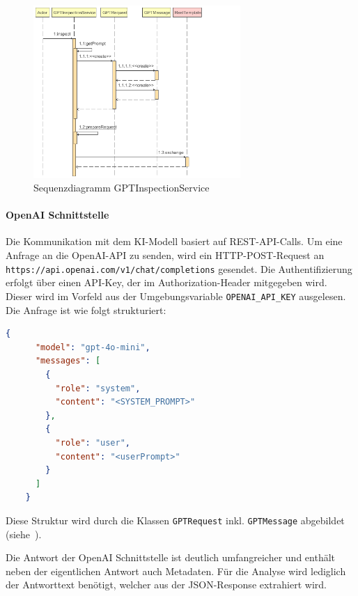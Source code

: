 \documentclass[a4paper,12pt]{report}
\begin{document}
    \begin{figure}[h]
        \centering
        \includegraphics[width=0.7\textwidth]{assets/GPTInspectionService_inspect_seq_diag}
        \caption{Sequenzdiagramm GPTInspectionService}
        \label{fig:seq-diag-gpt-inspection-service}
    \end{figure}

    \clearpage
    \paragraph*{OpenAI Schnittstelle}\label{par:openai-schnittstelle}
    Die Kommunikation mit dem KI-Modell basiert auf REST-API-Calls.
    Um eine Anfrage an die OpenAI-API zu senden, wird ein HTTP-POST-Request an \texttt{https://api.openai.com/v1/chat/completions} gesendet.
    Die Authentifizierung erfolgt über einen API-Key, der im Authorization-Header mitgegeben wird.
    Dieser wird im Vorfeld aus der Umgebungsvariable \texttt{OPENAI\_API\_KEY} ausgelesen.
    Die Anfrage ist wie folgt strukturiert:

    \begin{lstlisting}[language=json,label={lst:openai-request}]
    {
      "model": "gpt-4o-mini",
      "messages": [
        {
          "role": "system",
          "content": "<SYSTEM_PROMPT>"
        },
        {
          "role": "user",
          "content": "<userPrompt>"
        }
      ]
    }
    \end{lstlisting}
    Diese Struktur wird durch die Klassen \texttt{GPTRequest} inkl. \texttt{GPTMessage} abgebildet (siehe~).

    Die Antwort der OpenAI Schnittstelle ist deutlich umfangreicher und enthält neben der eigentlichen Antwort auch Metadaten.
    Für die Analyse wird lediglich der Antworttext benötigt, welcher aus der JSON-Response extrahiert wird.
\end{document}
